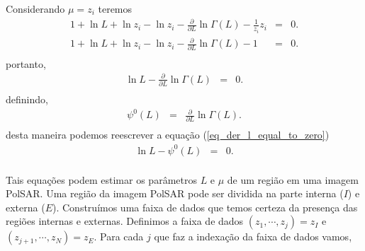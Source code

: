 \documentclass[journal,article,submit,moreauthors,pdftex]{Definitions/mdpi}
\begin{document}
Considerando $\mu=z_i$ teremos
\begin{equation}\nonumber
\begin{array}{ccc}
	1 + \ln L + \ln z_{i}-\ln z_i -\frac{\partial}{\partial L}\ln \Gamma(L)-\frac{1}{z_i} z_i&=&0.\\
	1 + \ln L + \ln z_{i}-\ln z_i -\frac{\partial}{\partial L}\ln \Gamma(L)-1&=&0.\\
\end{array}
\end{equation}
portanto,
\begin{equation}\label{eq_der_l_equal_to_zero}
\begin{array}{ccc}
	\ln L -\frac{\partial}{\partial L}\ln \Gamma(L)&=&0.\\
\end{array}
\end{equation}
definindo,
\begin{equation}\label{poly_gamma_function_order_zero}
\begin{array}{ccc}
	\psi^0(L)&=&\frac{\partial}{\partial L}\ln \Gamma(L).\\
\end{array}
\end{equation}
desta maneira podemos reescrever a equação (\ref{eq_der_l_equal_to_zero}) 
\begin{equation}\label{eq_der_l_equal_to_zero_psi}
\begin{array}{ccc}
	\ln L -\psi^0(L)&=&0.\\
\end{array}
\end{equation}

Tais equações podem estimar os parâmetros $L$ e $\mu$ de um região em uma imagem PolSAR.
Uma região da imagem PolSAR pode ser dividida na parte interna ($I$) e externa ($E$). Construímos uma faixa de dados que temos certeza da presença das regiões internas e externas. Definimos a faixa de dados $(z_1, \cdots,z_j)= z_I$ e $(z_{j+1}, \cdots,z_N)= z_E$. Para cada $j$ que faz a indexação da faixa de dados vamos,
  
\end{document}
